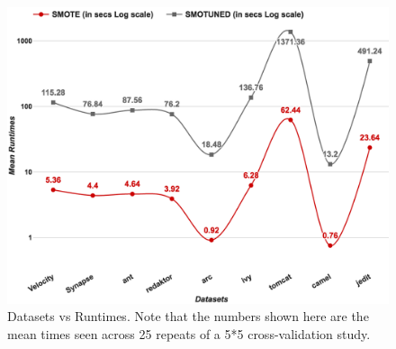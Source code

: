 \documentclass[10pt,conference]{IEEEtran}
\theoremstyle{break}
\theoremstyle{break}
\begin{document}
\begin{figure}[!t]
  \captionsetup{justification=centering}
                                                   \includegraphics[width=\linewidth]{./fig/runtimes.png}
  \caption{Datasets vs Runtimes. Note that the numbers
  shown here are the mean times seen across 25 repeats of a 5*5 cross-validation study.
  }
  \label{runtime}
\vspace{-0.6cm}
\end{figure}
\end{document}
